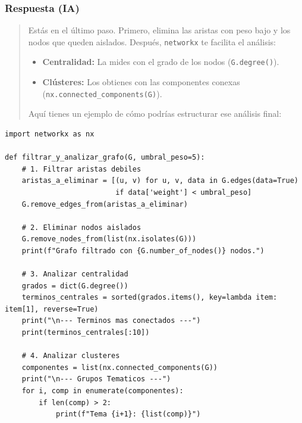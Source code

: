 \documentclass[12pt]{article}
\begin{document}
\subsubsection*{Respuesta (IA)}
\begin{quote}
Estás en el último paso. Primero, elimina las aristas con peso bajo y los nodos que queden aislados. Después, \texttt{networkx} te facilita el análisis:
\begin{itemize}
    \item \textbf{Centralidad:} La mides con el grado de los nodos (\texttt{G.degree()}).
    \item \textbf{Clústeres:} Los obtienes con las componentes conexas (\texttt{nx.connected\_components(G)}).
\end{itemize}
Aquí tienes un ejemplo de cómo podrías estructurar ese análisis final:
\end{quote}
\begin{lstlisting}
import networkx as nx

def filtrar_y_analizar_grafo(G, umbral_peso=5):
    # 1. Filtrar aristas debiles
    aristas_a_eliminar = [(u, v) for u, v, data in G.edges(data=True) 
                          if data['weight'] < umbral_peso]
    G.remove_edges_from(aristas_a_eliminar)
    
    # 2. Eliminar nodos aislados
    G.remove_nodes_from(list(nx.isolates(G)))
    print(f"Grafo filtrado con {G.number_of_nodes()} nodos.")

    # 3. Analizar centralidad
    grados = dict(G.degree())
    terminos_centrales = sorted(grados.items(), key=lambda item: item[1], reverse=True)
    print("\n--- Terminos mas conectados ---")
    print(terminos_centrales[:10])
    
    # 4. Analizar clusteres
    componentes = list(nx.connected_components(G))
    print("\n--- Grupos Tematicos ---")
    for i, comp in enumerate(componentes):
        if len(comp) > 2:
            print(f"Tema {i+1}: {list(comp)}")
\end{lstlisting}
\end{document}
